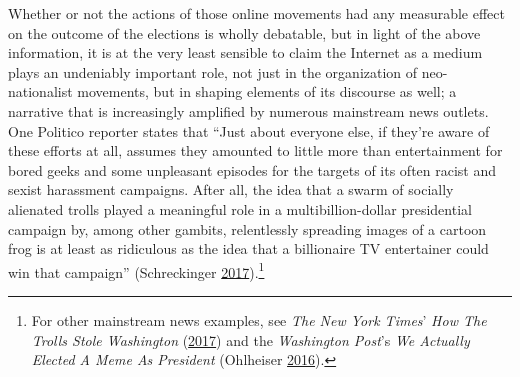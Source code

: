 \documentclass[10pt,british,A4paper,,openany]{memoir}
\begin{document}
Whether or not the actions of those online movements had any measurable
effect on the outcome of the elections is wholly debatable, but in light
of the above information, it is at the very least sensible to claim the
Internet as a medium plays an undeniably important role, not just in the
organization of neo-nationalist movements, but in shaping elements of
its discourse as well; a narrative that is increasingly amplified by
numerous mainstream news outlets. One Politico reporter states that
``Just about everyone else, if they're aware of these efforts at all,
assumes they amounted to little more than entertainment for bored geeks
and some unpleasant episodes for the targets of its often racist and
sexist harassment campaigns. After all, the idea that a swarm of
socially alienated trolls played a meaningful role in a
multibillion-dollar presidential campaign by, among other gambits,
relentlessly spreading images of a cartoon frog is at least as
ridiculous as the idea that a billionaire TV entertainer could win that
campaign'' (Schreckinger
\protect\hyperlink{ref-schreckinger_world_2017}{2017}).\footnote{For
  other mainstream news examples, see \emph{The New York Times}'
  \emph{How The Trolls Stole Washington}
  (\protect\hyperlink{ref-hess_how_2017}{2017}) and the \emph{Washington
  Post}'s \emph{We Actually Elected A Meme As President} (Ohlheiser
  \protect\hyperlink{ref-ohlheiser_analysis_2016}{2016}).}
\end{document}
